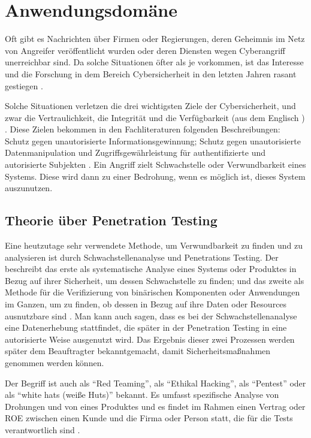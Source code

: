 \section{Anwendungsdomäne}

Oft gibt es Nachrichten über Firmen oder Regierungen, deren Geheimnis im Netz von Angreifer veröffentlicht wurden oder deren Diensten wegen \gls{Cyberangriff} unerreichbar sind. Da solche Situationen öfter als je vorkommen, ist das Interesse und die Forschung in dem Bereich \gls{Cybersicherheit} in den letzten Jahren rasant gestiegen \cite{Tanembaum_MBS}. 

Solche Situationen verletzen die drei wichtigsten Ziele der \gls{Cybersicherheit}, und zwar die Vertraulichkeit, die Integrität und die Verfügbarkeit (aus dem Englisch ) . Diese Zielen bekommen in den Fachliteraturen folgenden Beschreibungen: Schutz gegen unautorisierte Informationsgewinnung; Schutz gegen unautorisierte Datenmanipulation und Zugriffsgewährleistung für authentifizierte und autorisierte Subjekten \cite{Wendzel_It-Sicherheit}. Ein Angriff zielt \gls{Schwachstelle} oder \gls{Verwundbarkeit} eines Systems. Diese wird dann zu einer Bedrohung, wenn es möglich ist, dieses System auszunutzen.

\subsection{Theorie über Penetration Testing}

Eine heutzutage sehr verwendete Methode, um \gls{Verwundbarkeit} zu finden und zu analysieren ist durch Schwachstellenanalyse und Penetrations Testing. Der  beschreibt das erste als systematische Analyse eines Systems oder Produktes in Bezug auf ihrer Sicherheit, um dessen \gls{Schwachstelle} zu finden; und das zweite als Methode für die Verifizierung von binärischen Komponenten oder Anwendungen im Ganzen, um zu finden, ob dessen  in Bezug auf ihre Daten oder Resources ausnutzbare sind \cite{NIST_Definitionen}. Man kann auch sagen, dass es bei der Schwachstellenanalyse eine Datenerhebung stattfindet, die später in der Penetration Testing in eine autorisierte Weise ausgenutzt wird\cite{Goel_VulAsses_PenTest}. Das Ergebnis dieser zwei Prozessen werden später dem Beauftragter bekanntgemacht, damit Sicherheitsmaßnahmen genommen werden können.

Der Begriff ist auch als ``Red Teaming'', als ``Ethikal Hacking'', als ``Pentest'' oder als ``white hats (weiße Huts)'' bekannt. Es umfasst spezifische Analyse von Drohungen und von  eines Produktes und es findet im Rahmen einen Vertrag oder \gls{ROE} zwischen einen Kunde und die Firma oder Person statt, die für die Tests verantwortlich sind \cite{Bishop_PenTest}.

